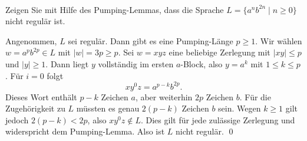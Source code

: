 \\
Zeigen Sie mit Hilfe des Pumping-Lemmas, dass die Sprache
$L = \{ a^n b^{2n} \mid n\geq 0\}$ nicht regulär ist.

\begin{loesung}
Angenommen, $L$ sei regulär. Dann gibt es eine Pumping-Länge $p\geq1$.
Wir wählen $w=a^pb^{2p}\in L$ mit $|w|=3p\geq p$.
Sei $w=xyz$ eine beliebige Zerlegung mit $|xy|\leq p$ und $|y|\geq1$.
Dann liegt $y$ vollständig im ersten $a$-Block, also $y=a^k$ mit $1\leq k\leq p$.
Für $i=0$ folgt
\[
xy^0z=a^{p-k}b^{2p}.
\]
Dieses Wort enthält $p-k$ Zeichen $a$, aber weiterhin $2p$ Zeichen $b$.
Für die Zugehörigkeit zu $L$ müssten es genau $2(p-k)$ Zeichen $b$ sein.
Wegen $k\geq1$ gilt jedoch $2(p-k)<2p$, also $xy^0z\notin L$.
Dies gilt für jede zulässige Zerlegung und widerspricht dem Pumping-Lemma.
Also ist $L$ nicht regulär. \qed
\end{loesung}






